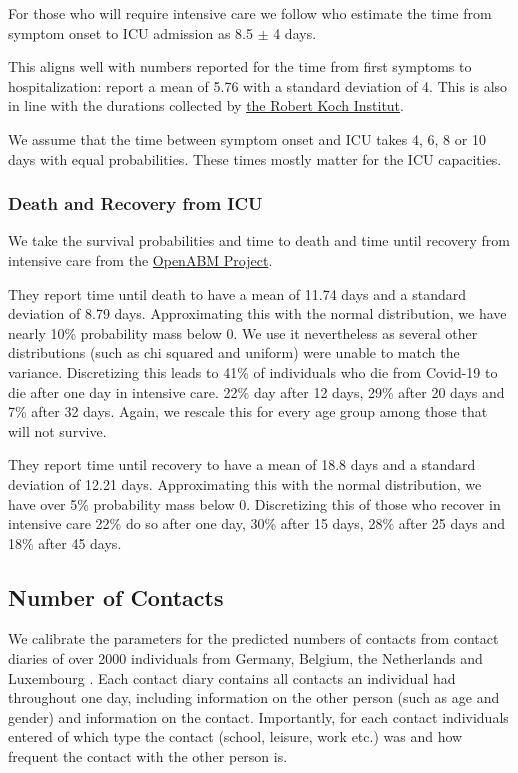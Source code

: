 For those who will require intensive care we follow \cite{Chen2020} who estimate the time from symptom onset to ICU admission as 8.5 $\pm$ 4 days.

This aligns well with numbers reported for the time from first symptoms to hospitalization: \cite{Gaythorpe2020} report a mean of 5.76 with a standard deviation of 4. This is also in line with the durations collected by \href{https://www.rki.de/DE/Content/InfAZ/N/Neuartiges_Coronavirus/Steckbrief.html#doc13776792bodyText16}{the Robert Koch Institut}.

We assume that the time between symptom onset and ICU takes 4, 6, 8 or 10 days with equal probabilities. These times mostly matter for the ICU capacities.


\subsubsection{Death and Recovery from ICU}

We take the survival probabilities and time to death and time until recovery from intensive care from the \href{https://tinyurl.com/y5owhyts}{OpenABM Project}.

They report time until death to have a mean of 11.74 days and a standard deviation of 8.79 days. Approximating this with the normal distribution, we have nearly 10\% probability mass below 0. We use it nevertheless as several other distributions (such as chi squared and uniform) were unable to match the variance.
Discretizing this leads to 41\% of individuals who die from Covid-19 to die after one day in intensive care. 22\% day after 12 days, 29\% after 20 days and 7\% after 32 days. Again, we rescale this for every age group among those that will not survive.

They report time until recovery to have a mean of 18.8 days and a standard deviation of 12.21 days. Approximating this with the normal distribution, we have over 5\% probability mass below 0. Discretizing this of those who recover in intensive care 22\% do so after one day, 30\% after 15 days, 28\% after 25 days and 18\% after 45 days.



\subsection{Number of Contacts}

We calibrate the parameters for the predicted numbers of contacts from contact diaries of over 2000 individuals from Germany, Belgium, the Netherlands and Luxembourg \citep{Mossong2008}. Each contact diary contains all contacts an individual had throughout one day, including information on the other person (such as age and gender) and information on the contact. Importantly, for each contact individuals entered of which type the contact (school, leisure, work etc.) was and how frequent the contact with the other person is.

